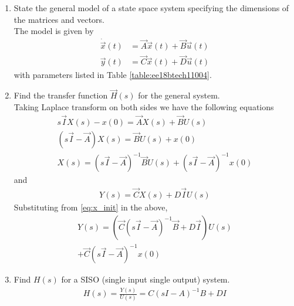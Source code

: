 \begin{enumerate}[label=\thesubsection.\arabic*.,ref=\thesubsection.\theenumi]
\item State the general model of a state space system specifying the dimensions of the matrices and vectors.
\\
\solution The model is given by 
\begin{align}
\label{eq:ee18btech11004_state}
\dot{\vec{x}}(t)&=\vec{A}\vec{x}(t)+\vec{B}\vec{u}(t) \\
 \vec{y}(t)&=\vec{C}\vec{x}(t)+\vec{D} \vec{u}(t)
\end{align}
%
with parameters listed in Table \ref{table:ee18btech11004}.
%
\begin{table}[!ht]
\centering

\caption{}
\label{table:ee18btech11004}
\end{table}
\item Find the transfer function $\vec{H}(s)$ for the general system.
\\
\solution 
Taking Laplace transform on both sides we have the following equations
\begin{align}
s\vec{I}X(s)-x(0)= \vec{A}X(s)+ \vec{B}U(s)\\
(s\vec{I}-\vec{A})X(s)= \vec{B}U(s)+ x(0)\\
X(s)={(s\vec{I}-\vec{A})^{-1}}\vec{B} U(s)+ (s\vec{I}-\vec{A})^{-1}x(0)
\label{eq:x_init}
\end{align}
and
\begin{align}
Y(s)= \vec{C}X(s)+D\vec{I}U(s)
\end{align}
Substituting from \eqref{eq:x_init} in the above,
%
\begin{multline}
Y(s)=( \vec{C}{(s\vec{I}-\vec{A})^{-1}}\vec{B}+D\vec{I}) U(s) 
\\
+ \vec{C}(s\vec{I}-\vec{A})^{-1}x(0)
\end{multline}
%
\item Find $H(s)$ for a SISO (single input single output) system.
\\
\solution
\begin{align}
\label{eq:ee18btech11004_siso}
H(s)= {\frac{Y(s)}{U(s)}}= C{(sI-A)^{-1}}B+DI
\end{align}


\end{enumerate}

